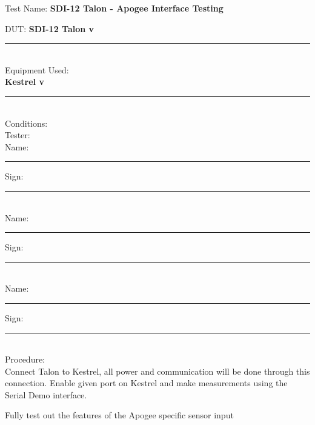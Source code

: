 \noindent
\setlength\parindent{0pt}

{\Huge Test Name: \textbf{SDI-12 Talon - Apogee Interface Testing}}\\[20pt]
{\Large DUT: \textbf{SDI-12 Talon v}\rule{1cm}{0.15mm}} \\[10pt]
{\Large Equipment Used: }\\[5pt]
\textbf{Kestrel v}\rule{1cm}{0.15mm}\\[40pt]
{\Large Conditions: }\\[40pt]
{\Large Tester: }\\[10pt]
Name: \rule{4cm}{0.15mm} \hfill Sign: \rule{4cm}{0.15mm}\\[5pt]
Name: \rule{4cm}{0.15mm} \hfill Sign: \rule{4cm}{0.15mm}\\[5pt]
Name: \rule{4cm}{0.15mm} \hfill Sign: \rule{4cm}{0.15mm}\\[15pt]
{\Large Procedure: }\\
Connect Talon to Kestrel, all power and communication will be done through this connection. Enable given port on Kestrel and make measurements using the Serial Demo interface. 

Fully test out the features of the Apogee specific sensor input

